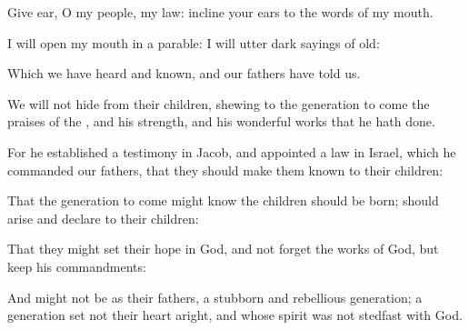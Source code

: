{\Q {}Give
ear, O my
people,
{} my
law:
incline your
ears to the
words of my
mouth.


\par }{\Q {}I will
open my
mouth in a
parable: I will
utter dark
sayings of
old:


\par }{\Q {}Which we have
heard and
known, and our
fathers have
told us.


\par }{\Q {}We will not
hide
{} from their
children,
shewing to the
generation to
come the
praises of the
{}, and his
strength, and his wonderful
works that he hath
done.


\par }{\Q {}For he
established a
testimony in
Jacob, and
appointed a
law in
Israel, which he
commanded our
fathers, that they should make them
known to their
children:


\par }{\Q {}That the
generation to
come might
know
{} the
children
{} should be
born;
{} should
arise and
declare
{} to their
children:


\par }{\Q {}That they might
set their
hope in
God, and not
forget the
works of
God, but
keep his
commandments:


\par }{\Q {}And might not be as their
fathers, a
stubborn and
rebellious
generation; a
generation
{}
set not their
heart
aright, and whose
spirit was not
stedfast with
God.


\par }{\BB \par }
